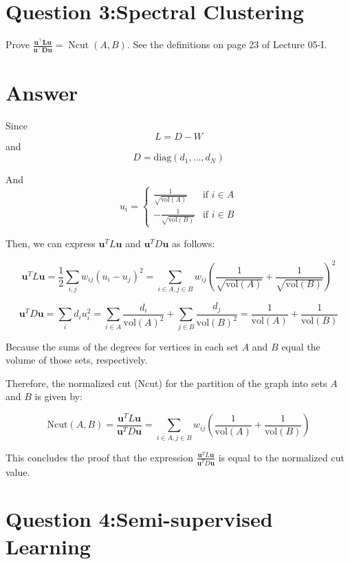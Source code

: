 \documentclass[
	12pt, %
]{fphw}
\begin{document}
\section*{Question 3:Spectral Clustering}

\begin{problem}
	Prove $\frac{\mathbf{u}^{\top} \mathbf{L u}}{\mathbf{u}^{\top} \mathbf{D u}}=\operatorname{Ncut}(A, B)$. See the definitions on page 23 of Lecture 05-I.
\end{problem}
\section*{Answer}
Since \[ L = D - W \]
and
\[ D = \text{diag}(d_1, \ldots, d_N) \]

And 
\[ u_i = 
\begin{cases} 
\frac{1}{\sqrt{\text{vol}(A)}} & \text{if } i \in A \\
-\frac{1}{\sqrt{\text{vol}(B)}} & \text{if } i \in B
\end{cases} \]

Then, we can express $\mathbf{u}^T L \mathbf{u}$ and $\mathbf{u}^T D \mathbf{u}$ as follows:

\[ \mathbf{u}^T L \mathbf{u} = \frac{1}{2} \sum_{i,j} w_{ij}(u_i - u_j)^2 = \sum_{i \in A, j \in B} w_{ij} \left( \frac{1}{\sqrt{\text{vol}(A)}} + \frac{1}{\sqrt{\text{vol}(B)}} \right)^2 \]

\[ \mathbf{u}^T D \mathbf{u} = \sum_{i} d_i u_i^2 = \sum_{i \in A} \frac{d_i}{\text{vol}(A)^2} + \sum_{j \in B} \frac{d_j}{\text{vol}(B)^2} =\frac{1}{\text{vol}(A)} +\frac{1}{\text{vol}(B)} \]

Because the sums of the degrees for vertices in each set $A$ and $B$ equal the volume of those sets, respectively.

Therefore, the normalized cut (Ncut) for the partition of the graph into sets $A$ and $B$ is given by:

\[ \text{Ncut}(A, B) = \frac{\mathbf{u}^T L \mathbf{u}}{\mathbf{u}^T D \mathbf{u}} = \sum_{i \in A, j \in B} w_{ij} \left( \frac{1}{\text{vol}(A)} + \frac{1}{\text{vol}(B)} \right) \]

This concludes the proof that the expression $\frac{\mathbf{u}^T L \mathbf{u}}{\mathbf{u}^T D \mathbf{u}}$ is equal to the normalized cut value.


\section*{Question 4:Semi-supervised Learning }
\end{document}
